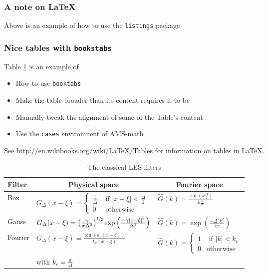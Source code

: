 \subsubsection*{A note on \LaTeX{}}

Above is an example of how to use the \verb+listings+ package





\subsubsection{Nice tables with \texttt{bookstabs}}

Table \ref{tab:classicalLES_filters} is an example of

\begin{itemize}
	\item How to use \verb+booktabs+
	\item Make the table broader than its content requires it to be
	\item Manually tweak the alignment of some of the Table's content
	\item Use the \verb+cases+ environment of AMS-math
\end{itemize}


See \url{http://en.wikibooks.org/wiki/LaTeX/Tables} for information on tables in \LaTeX{}.


\begin{table}
	\centering
	\begin{tabular*}{0.8\textwidth}{ @{\extracolsep{\fill} } lll}
	\toprule
	Filter & \multicolumn{1}{c}{Physical space} & \multicolumn{1}{c}{Fourier space} \\
	\midrule
	Box 
		& $G_{\Delta}(x - \xi) = \begin{cases}
				\frac{1}{\Delta} & \text{ if } \vert x - \xi \vert < \frac{\Delta}{2} \\
				0 & \text{ otherwise}
			\end{cases}$ 
		& $\hat{G}(k) = \frac{\sin(k \frac{\Delta}{2})}{k \frac{\Delta}{2}}$ \\
	Gauss 
		& $G_{\Delta}(x - \xi) = \left( \frac{\gamma}{\pi \Delta^2} \right)^{\sfrac{1}{2}} 
			\exp\left( \frac{-\gamma \vert x - \xi \vert^2}{\Delta^2} \right)$
		& $\hat{G}(k) = \exp\left( \frac{-\Delta^2 k^2}{4 \gamma} \right)$ \\
	Fourier 
		& $G_{\Delta}(x - \xi) = \frac{\sin (k_c(x-\xi))}{k_c(x-\xi)}$
		& $\hat{G}(k) = \begin{cases}
				1 & \text{ if } \vert k \vert < k_c \\
				0 & \text{otherwise}
			\end{cases}$ \\
		& with $k_c = \frac{\pi}{\Delta}$ & \\
	\bottomrule
	\end{tabular*}
	\caption{The classical \ac{LES} filters}
	\label{tab:classicalLES_filters}
\end{table}




